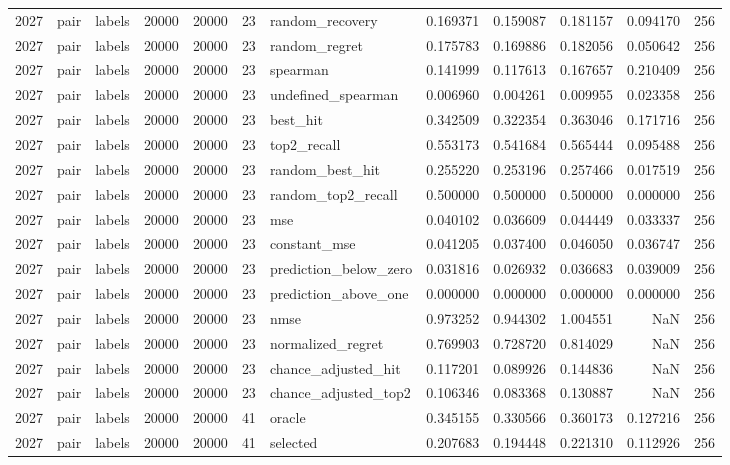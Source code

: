 \begin{tabular}{rllrrrlrrrrr}
2027 & pair & labels & 20000 & 20000 & 23 & random_recovery & 0.169371 & 0.159087 & 0.181157 & 0.094170 & 256 \\
2027 & pair & labels & 20000 & 20000 & 23 & random_regret & 0.175783 & 0.169886 & 0.182056 & 0.050642 & 256 \\
2027 & pair & labels & 20000 & 20000 & 23 & spearman & 0.141999 & 0.117613 & 0.167657 & 0.210409 & 256 \\
2027 & pair & labels & 20000 & 20000 & 23 & undefined_spearman & 0.006960 & 0.004261 & 0.009955 & 0.023358 & 256 \\
2027 & pair & labels & 20000 & 20000 & 23 & best_hit & 0.342509 & 0.322354 & 0.363046 & 0.171716 & 256 \\
2027 & pair & labels & 20000 & 20000 & 23 & top2_recall & 0.553173 & 0.541684 & 0.565444 & 0.095488 & 256 \\
2027 & pair & labels & 20000 & 20000 & 23 & random_best_hit & 0.255220 & 0.253196 & 0.257466 & 0.017519 & 256 \\
2027 & pair & labels & 20000 & 20000 & 23 & random_top2_recall & 0.500000 & 0.500000 & 0.500000 & 0.000000 & 256 \\
2027 & pair & labels & 20000 & 20000 & 23 & mse & 0.040102 & 0.036609 & 0.044449 & 0.033337 & 256 \\
2027 & pair & labels & 20000 & 20000 & 23 & constant_mse & 0.041205 & 0.037400 & 0.046050 & 0.036747 & 256 \\
2027 & pair & labels & 20000 & 20000 & 23 & prediction_below_zero & 0.031816 & 0.026932 & 0.036683 & 0.039009 & 256 \\
2027 & pair & labels & 20000 & 20000 & 23 & prediction_above_one & 0.000000 & 0.000000 & 0.000000 & 0.000000 & 256 \\
2027 & pair & labels & 20000 & 20000 & 23 & nmse & 0.973252 & 0.944302 & 1.004551 & NaN & 256 \\
2027 & pair & labels & 20000 & 20000 & 23 & normalized_regret & 0.769903 & 0.728720 & 0.814029 & NaN & 256 \\
2027 & pair & labels & 20000 & 20000 & 23 & chance_adjusted_hit & 0.117201 & 0.089926 & 0.144836 & NaN & 256 \\
2027 & pair & labels & 20000 & 20000 & 23 & chance_adjusted_top2 & 0.106346 & 0.083368 & 0.130887 & NaN & 256 \\
2027 & pair & labels & 20000 & 20000 & 41 & oracle & 0.345155 & 0.330566 & 0.360173 & 0.127216 & 256 \\
2027 & pair & labels & 20000 & 20000 & 41 & selected & 0.207683 & 0.194448 & 0.221310 & 0.112926 & 256 \\

\end{tabular}
